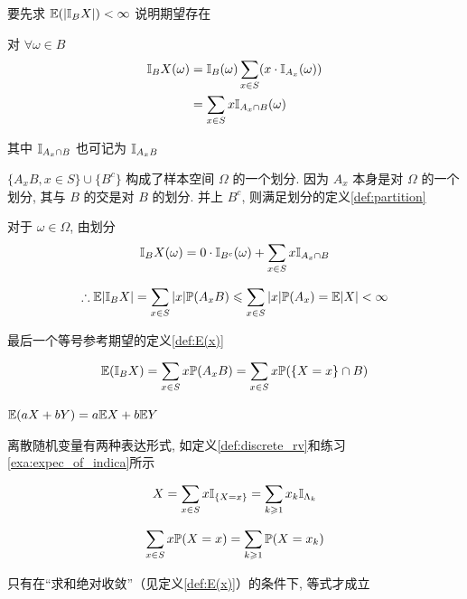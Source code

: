 \begin{solution*}
要先求 $\mathbb E(|\mathbb I_B X|)<\infty$ 说明期望存在

对 $\forall \omega\in B$
\[
\begin{aligned}
    \mathbb I_B X(\omega)&=\mathbb I_B(\omega)\sum_{x\in S}(x\cdot \mathbb I_{A_x}(\omega))\\
    &=\sum_{x\in S}x\mathbb I_{A_x\cap B}(\omega)
\end{aligned}
\]

其中 $\mathbb I_{A_x\cap B}$ 也可记为 $\mathbb I_{A_x B}$

$\{A_x B,x\in S\}\cup \{B^c\}$ 构成了样本空间 $\Omega$ 的一个划分. 因为 $A_x$ 本身是对 $\Omega$ 的一个划分, 其与 $B$ 的交是对 $B$ 的划分. 并上 $B^c$, 则满足划分的定义\ref{def:partition}

对于 $\omega\in \Omega$, 由划分
\[
\mathbb I_B X(\omega)=0\cdot \mathbb I_{B^c}(\omega)+\sum_{x\in S}x\mathbb I_{A_x\cap B}
\]

\[
\therefore \mathbb E |\mathbb I_B X|=\sum_{x\in S}|x|\mathbb{P}(A_x B)\leqslant \sum_{x\in S}|x|\mathbb{P}(A_x)=\mathbb E|X|<\infty
\]

最后一个等号参考期望的定义\ref{def:E(x)}

\[
\mathbb E (\mathbb I_B X)=\sum_{x\in S}x \mathbb{P}(A_x B)=\sum_{x\in S}x \mathbb{P}(\{X=x\}\cap B)
\]
\end{solution*}

\begin{theorem}
    $\mathbb E(aX+bY)=a\mathbb E X+b\mathbb E Y$
\end{theorem}

离散随机变量有两种表达形式, 如定义\ref{def:discrete_rv}和练习\ref{exa:expec_of_indica}所示

\[
X=\sum_{x\in S}x\mathbb I_{\{X=x\}}=\sum_{k\geqslant 1}x_k\mathbb I_{\Lambda_k}
\]

\[
\sum_{x\in S}x\mathbb{P}(X=x)=\sum_{k\geqslant 1}\mathbb{P}(X=x_k)
\]

只有在“求和绝对收敛”（见定义\ref{def:E(x)}）的条件下, 等式才成立

